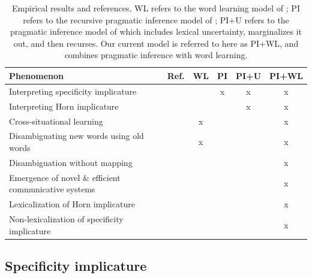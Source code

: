 \documentclass{article} %
\begin{document}
\begin{table}[t]
\label{tab:results}
\begin{center}
\begin{tabular}{lccccc}
\toprule
Phenomenon & Ref. & WL & PI & PI+U & PI+WL \\
\midrule
Interpreting specificity implicature & \cite{grice1975} &  & x &x & x\\
Interpreting Horn implicature & \cite{horn1984} & &  & x& x\\
Cross-situational learning & \cite{smith2008} & x& & & x \\
Disambiguating new words using old words & \cite{markman1988} &x  & & & x \\
Disambiguation without mapping & \cite{horst2008} &  & & & x \\
Emergence of novel \& efficient communicative systems & \cite{galantucci2005} & & & & x \\
Lexicalization of Horn implicature & \cite{horn1984} & & & & x \\
Non-lexicalization of specificity implicature & \cite{levinson2000} & & & & x \\
\hline
\end{tabular}
\end{center}
\caption{Empirical results and references. WL refers to the word
  learning model of \cite{frank2009}; PI refers to the recursive
  pragmatic inference model of \cite{frank2012}; PI+U refers to the
  pragmatic inference model of \cite{bergen2012} which includes
  lexical uncertainty, marginalizes it out, and then recurses. Our
  current model is referred to here as PI+WL, and combines pragmatic
  inference with word learning.}
\end{table}



\subsection{Specificity implicature}

\label{sec:spec}
\end{document}
